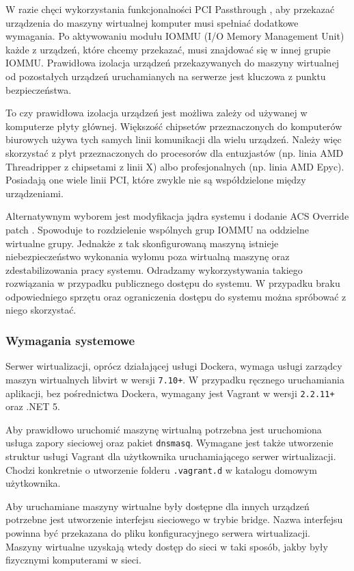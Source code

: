 \documentclass[../opis-rozwiazania.tex]{subfiles}
\begin{document}
W razie chęci wykorzystania funkcjonalności PCI Passthrough \parencite{pci-passthrough}, aby przekazać urządzenia do maszyny wirtualnej komputer musi spełniać dodatkowe wymagania.
Po aktywowaniu modułu IOMMU (I/O Memory Management Unit) \parencite{amd-iommu} każde z urządzeń, które chcemy przekazać, musi znajdować się w innej grupie IOMMU.
Prawidłowa izolacja urządzeń przekazywanych do maszyny wirtualnej od pozostałych urządzeń uruchamianych na serwerze jest kluczowa z punktu bezpieczeństwa.

To czy prawidłowa izolacja urządzeń jest możliwa zależy od używanej w komputerze płyty głównej.
Większość chipsetów przeznaczonych do komputerów biurowych używa tych samych linii komunikacji dla wielu urządzeń.
Należy więc skorzystać z płyt przeznaczonych do procesorów dla entuzjastów (np. linia AMD Threadripper z chipsetami z linii X) albo profesjonalnych (np. linia AMD Epyc).
Posiadają one wiele linii PCI, które zwykle nie są współdzielone między urządzeniami.

Alternatywnym wyborem jest modyfikacja jądra systemu i dodanie ACS Override patch \parencite{acs-override}.
Spowoduje to rozdzielenie wspólnych grup IOMMU na oddzielne wirtualne grupy.
Jednakże z tak skonfigurowaną maszyną istnieje niebezpieczeństwo wykonania wyłomu poza wirtualną maszynę oraz zdestabilizowania pracy systemu.
Odradzamy wykorzystywania takiego rozwiązania w przypadku publicznego dostępu do systemu.
W przypadku braku odpowiedniego sprzętu oraz ograniczenia dostępu do systemu można spróbować z niego skorzystać.

\subsubsection{Wymagania systemowe}
Serwer wirtualizacji, oprócz działającej usługi Dockera, wymaga usługi zarządcy maszyn wirtualnych libvirt w wersji \texttt{7.10+}. W przypadku ręcznego uruchamiania aplikacji, bez pośrednictwa Dockera, wymagany jest Vagrant w wersji \texttt{2.2.11+} oraz .NET 5.

Aby prawidłowo uruchomić maszynę wirtualną potrzebna jest uruchomiona usługa zapory sieciowej oraz pakiet \texttt{dnsmasq}.
Wymagane jest także utworzenie struktur usługi Vagrant dla użytkownika uruchamiającego serwer wirtualizacji.
Chodzi konkretnie o utworzenie folderu \texttt{.vagrant.d} w katalogu domowym użytkownika.

Aby uruchamiane maszyny wirtualne były dostępne dla innych urządzeń potrzebne jest utworzenie interfejsu sieciowego w trybie bridge.
Nazwa interfejsu powinna być przekazana do pliku konfiguracyjnego serwera wirtualizacji.
Maszyny wirtualne uzyskają wtedy dostęp do sieci w taki sposób, jakby były fizycznymi komputerami w sieci.
\end{document}
